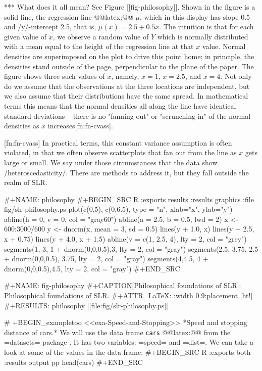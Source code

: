 *** What does it all mean?
See Figure [[fig-philosophy]]. Shown in the figure is a solid line, the
regression line @@latex:@@ \(\mu\), which in
this display has slope 0.5 and /y/-intercept 2.5, that is, \( \mu(x) =
2.5 + 0.5x \). The intuition is that for each given value of \(x\), we
observe a random value of \(Y\) which is normally distributed with a
mean equal to the height of the regression line at that \(x\)
value. Normal densities are superimposed on the plot to drive this
point home; in principle, the densities stand outside of the page,
perpendicular to the plane of the paper. The figure shows three such
values of \(x\), namely, \( x = 1 \), \( x = 2.5 \), and \( x = 4
\). Not only do we assume that the observations at the three locations
are independent, but we also assume that their distributions have the
same spread. In mathematical terms this means that the normal
densities all along the line have identical standard deviations --
there is no "fanning out" or "scrunching in" of the normal densities
as \(x\) increases[fn:fn-cvass].

[fn:fn-cvass] In practical terms, this constant variance assumption is
often violated, in that we often observe scatterplots that fan out
from the line as \(x\) gets large or small. We say under those
circumstances that the data show /heteroscedasticity/. There are
methods to address it, but they fall outside the realm of SLR.

#+NAME: philosophy
#+BEGIN_SRC R :exports results :results graphics :file fig/slr-philosophy.ps
plot(c(0,5), c(0,6.5), type = "n", xlab="x", ylab="y")
abline(h = 0, v = 0, col = "gray60")
abline(a = 2.5, b = 0.5, lwd = 2)
x <- 600:3000/600
y <- dnorm(x, mean = 3, sd = 0.5)
lines(y + 1.0, x)
lines(y + 2.5, x + 0.75)
lines(y + 4.0, x + 1.5)
abline(v = c(1, 2.5, 4), lty = 2, col = "grey")
segments(1, 3, 1 + dnorm(0,0,0.5),3, lty = 2, col = "gray")
segments(2.5, 3.75, 2.5 + dnorm(0,0,0.5), 3.75, lty = 2, col = "gray")
segments(4,4.5, 4 + dnorm(0,0,0.5),4.5, lty = 2, col = "gray")
#+END_SRC

#+NAME: fig-philosophy
#+CAPTION[Philosophical foundations of SLR]: \small Philosophical foundations of SLR.
#+ATTR_LaTeX: :width 0.9\textwidth :placement [ht!]
#+RESULTS: philosophy
[[file:fig/slr-philosophy.ps]]


# +BEGIN_exampletoo
<<exa-Speed-and-Stopping>> *Speed and stopping distance of cars.* We
will use the data frame \texttt{cars} @@latex:@@ from the =datasets= package
\cite{datasets}. It has two variables: =speed= and =dist=. We can take
a look at some of the values in the data frame:
#+BEGIN_SRC R :exports both :results output pp 
head(cars)
#+END_SRC

